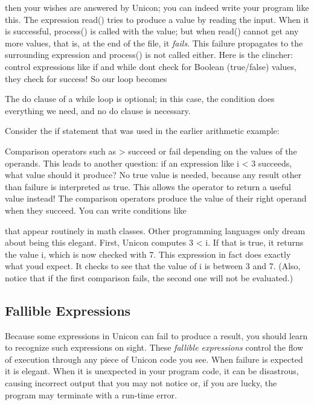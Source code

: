 
\noindent
then your wishes are answered by Unicon; you can indeed write your
program like this. The expression \textsf{read()} tries to produce a
value by reading the input. When it is successful, \textsf{process()}
is called with the value; but when \textsf{read()} cannot get any more
values, that is, at the end of the file, it \textit{fails}. This
failure propagates to the surrounding expression and \textsf{process()}
is not called either. Here is the clincher: control expressions like
\textsf{if} and \textsf{while} don{\textquotesingle}t check for Boolean
(true/false) values, they check for success! So our loop
becomes


The \textsf{do} clause of a \textsf{while} loop is
optional; in this case, the condition does everything
we need, and no \textsf{do} clause is necessary.

Consider the \textsf{if}\textsf{ }statement that was
used in the earlier arithmetic example:


Comparison operators such as \textsf{{\textgreater}} succeed or fail
depending on the values of the operands. This leads to another
question: if an expression like \textsf{i {\textless} 3} succeeds, what
value should it produce? No {\textquotedbl}true{\textquotedbl} value is
needed, because any result other than failure is interpreted as
{\textquotedbl}true.{\textquotedbl} This allows the operator to return
a useful value instead! The comparison
operators produce the value of their right operand when they succeed.
You can write conditions like


\noindent
that appear routinely in math classes. Other programming languages only
dream about being this elegant. First, Unicon computes \textsf{3
{\textless} i}. If that is true, it returns the value \textsf{i}, which
is now checked with 7. This expression in fact does exactly what
you{\textquotesingle}d expect. It checks to see that the value of
\textsf{i} is between 3 and 7. (Also, notice that if the first
comparison fails, the second one will not be evaluated.)

\subsection{Fallible Expressions}
Because some expressions in Unicon can fail to
produce a result, you should learn to recognize such expressions on
sight. These \textit{fallible
expression}\textit{s} control the flow of execution through any piece
of Unicon code you see. When failure is expected it is elegant. When it
is unexpected in your program code, it can be disastrous, causing
incorrect output that you may not notice or, if you are lucky, the
program may terminate with a run-time error.

